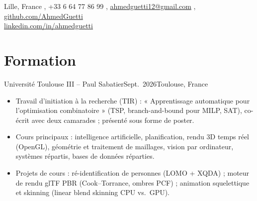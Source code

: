 \documentclass[french]{resume}
\begin{document}
  {Lille, France \sep
   +33 6 64 77 86 99 \sep
   \href{mailto:ahmedguetti12@gmail.com}{ahmedguetti12@gmail.com} \sep
   \href{https://github.com/AhmedGuetti}{github.com/AhmedGuetti}\\
   \href{https://www.linkedin.com/in/ahmedguetti/}{linkedin.com/in/ahmedguetti}}

\section{Formation}
  {Université Toulouse III – Paul Sabatier}{Sept.\ 2026}{Toulouse, France}
\begin{itemize}
  \item Travail d'initiation à la recherche (TIR) : « Apprentissage automatique pour l'optimisation combinatoire » (TSP, branch-and-bound pour MILP, SAT), co-écrit avec deux camarades ; présenté sous forme de poster.
  \item Cours principaux : intelligence artificielle, planification, rendu 3D temps réel (OpenGL), géométrie et traitement de maillages, vision par ordinateur, systèmes répartis, bases de données réparties.
  \item Projets de cours : ré-identification de personnes (LOMO + XQDA) ; moteur de rendu glTF PBR (Cook–Torrance, ombres PCF) ; animation squelettique et skinning (linear blend skinning CPU vs.\ GPU).
\end{itemize}
\end{document}
